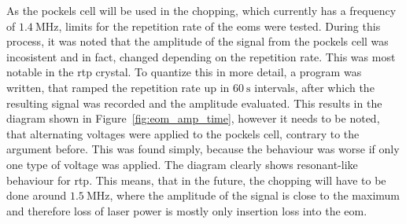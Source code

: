 \begin{figure}[t]%
\end{figure}

As the pockels cell will be used in the chopping, which currently has a frequency of $\SI{1.4}{\mega\hertz}$, limits for the repetition rate of the \acp{eom} were tested. During this process, it was noted that the amplitude of the signal from the pockels cell was incosistent and in fact, changed depending on the repetition rate. This was most notable in the \ac{rtp} crystal. To quantize this in more detail, a program was written, that ramped the repetition rate up in $\SI{60}{\second}$ intervals, after which the resulting signal was recorded and the amplitude evaluated. This results in the diagram shown in Figure~\ref{fig:eom_amp_time}, however it needs to be noted, that alternating voltages were applied to the pockels cell, contrary to the argument before. This was found simply, because the behaviour was worse if only one type of voltage was applied. The diagram clearly shows resonant-like behaviour for \ac{rtp}. This means, that in the future, the chopping will have to be done around $\SI{1.5}{\mega\hertz}$, where the amplitude of the signal is close to the maximum and therefore loss of laser power is mostly only insertion loss into the \ac{eom}.

\begin{figure}[t]%
\end{figure}

